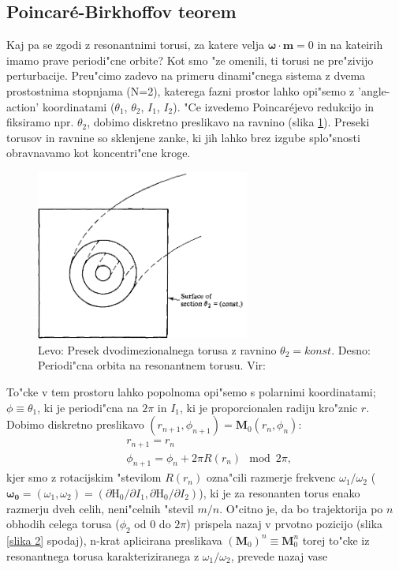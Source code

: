 \documentclass[]{article}
\begin{document}
\subsection{Poincar\'e-Birkhoffov teorem}
Kaj pa se zgodi z resonantnimi torusi, za katere velja $\boldsymbol{\omega}\cdot\boldsymbol{m}=0$ in na kateirih imamo prave periodi"cne orbite? Kot smo "ze omenili, ti torusi ne pre"zivijo perturbacije.\newline
Preu"cimo zadevo na primeru dinami"cnega sistema z dvema prostostnima stopnjama (N=2), katerega fazni prostor lahko opi"semo z 'angle-action' koordinatami ($\theta_1$, $\theta_2$, $I_1$, $I_2$). "Ce izvedemo Poincar\'ejevo redukcijo in fiksiramo npr. $\theta_2$, dobimo diskretno preslikavo na ravnino (slika \ref{slika 3}). Preseki torusov in ravnine so sklenjene zanke, ki jih lahko brez izgube splo"snosti obravnavamo kot koncentri"cne kroge.
\begin{figure}[!htb]
	\begin{center}
		\includegraphics[width = 7cm]{crosssection}
		\caption{Levo: Presek dvodimezionalnega torusa z ravnino $\theta_2=konst.$ Desno: Periodi"cna orbita na resonantnem torusu. Vir: \cite{1}}
		\label{slika 3}
	\end{center}
\end{figure}
\noindent To"cke v tem prostoru lahko popolnoma opi"semo s polarnimi koordinatami; $\phi\equiv\theta_1$, ki je periodi"cna na $2\pi$ in $I_1$, ki je proporcionalen radiju kro"znic $r$. Dobimo diskretno preslikavo $(r_{n+1},\phi_{n+1})=\boldsymbol{M}_0(r_{n},\phi_{n})$:
\begin{equation}
\begin{aligned}
&r_{n+1}=r_n\\
&\phi_{n+1}=\phi_{n}+2\pi R(r_n) \mod 2\pi,
\end{aligned}
\end{equation}
kjer smo z rotacijskim "stevilom $R(r_n)$ ozna"cili razmerje frekvenc $\omega_1/\omega_2$ ($\boldsymbol{\omega_0}=(\omega_1,\omega_2)=(\partial\text{H}_0/\partial I_1,\partial\text{H}_0/\partial I_2)$), ki je za resonanten torus enako razmerju dveh celih, neni"celnih "stevil $m/n$. O"citno je, da bo trajektorija po $n$ obhodih celega torusa ($\phi_2$ od $0$ do $2\pi$) prispela nazaj v prvotno pozicijo (slika \ref{slika 2} spodaj), n-krat aplicirana preslikava $(\boldsymbol{M}_0)^n\equiv\boldsymbol{M}_0^n$ torej to"cke iz resonantnega torusa karakteriziranega z $\omega_1/\omega_2$, prevede nazaj vase
\end{document}
